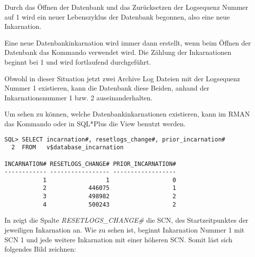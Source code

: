 
        Durch das \"Offnen der Datenbank und das Zur\"ucksetzen der Logsequenz Nummer auf 1 wird ein neuer Lebenszyklus der Datenbank begonnen, also eine neue Inkarnation.
        \begin{merke}
          Eine neue Datenbankinkarnation wird immer dann erstellt, wenn beim \"Offnen der Datenbank das Kommando  verwendet wird. Die Z\"ahlung der Inkarnationen beginnt bei 1 und wird fortlaufend durchgef\"uhrt.
        \end{merke}
        Obwohl in dieser Situation jetzt zwei Archive Log Dateien mit der Logsequenz Nummer 1 existieren, kann die Datenbank diese Beiden, anhand der Inkarnationsnummer 1 bzw. 2 auseinanderhalten.

        \begin{merke}
          Um sehen zu k\"onnen, welche Datenbankinkarnationen existieren, kann im RMAN das Kommando  oder in SQL*Plus die View   benutzt werden.
        \end{merke}

        \begin{lstlisting}[caption={Die View v\$database\_incarnation},label=admin1497,language=oracle_sql,emph={[9]CURRENT},emphstyle={[9]\color{black}}]
SQL> SELECT incarnation#, resetlogs_change#, prior_incarnation#
  2  FROM   v$database_incarnation

INCARNATION# RESETLOGS_CHANGE# PRIOR_INCARNATION#
------------ ----------------- ------------------
           1                 1                  0
           2            446075                  1
           3            498982                  2
           4            500243                  2

          \end{lstlisting}
\clearpage
          In  zeigt die Spalte \textit{RESETLOGS\_CHANGE\#}
          die SCN, des Startzeitpunktes der jeweiligen Inkarnation an. Wie zu
          sehen ist, beginnt Inkarnation Nummer 1 mit SCN 1 und jede weitere
          Inkarnation mit einer h\"oheren SCN. Somit l\"ast sich folgendes Bild
          zeichnen:


